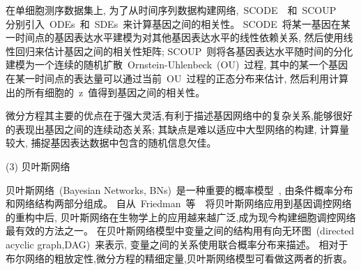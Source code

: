 在单细胞测序数据集上, 
为了从时间序列数据构建网络,~SCODE~\cite{matsumoto2017scode}~和~SCOUP~\cite{matsumoto2016scoup}~
分别引入~ODEs~和~SDEs~来计算基因之间的相关性。
SCODE~将某一基因在某一时间点的基因表达水平建模为对其他基因表达水平的线性依赖关系,
然后使用线性回归来估计基因之间的相关性矩阵;
SCOUP~则将各基因表达水平随时间的分化建模为一个连续的随机扩散~Ornstein-Uhlenbeck~(OU)~过程,
其中的某一个基因在某一时间点的表达量可以通过当前~OU~过程的正态分布来估计,
然后利用计算出的所有细胞的~z~值得到基因之间的相关性。

微分方程其主要的优点在于强大灵活,有利于描述基因网络中的复杂关系,能够很好的表现出基因之间的连续动态关系;
其缺点是难以适应中大型网络的构建, 计算量较大, 捕捉基因表达数据中包含的随机信息欠佳。

(3) 贝叶斯网络

贝叶斯网络~(Bayesian Networks, BNs)~是一种重要的概率模型~\cite{kim2003inferring,zou2004new,chen2006effective,needham2007primer,lo2015high},
由条件概率分布和网络结构两部分组成。
自从~Friedman~等~\cite{friedman2000using}~将贝叶斯网络应用到基因调控网络的重构中后,
贝叶斯网络在生物学上的应用越来越广泛,成为现今构建细胞调控网络最有效的方法之一。
在贝叶斯网络模型中变量之间的结构用有向无环图~(directed acyclic graph,DAG)~来表示,
变量之间的关系使用联合概率分布来描述。
相对于布尔网络的粗放定性,微分方程的精细定量,贝叶斯网络模型可看做这两者的折衷。

